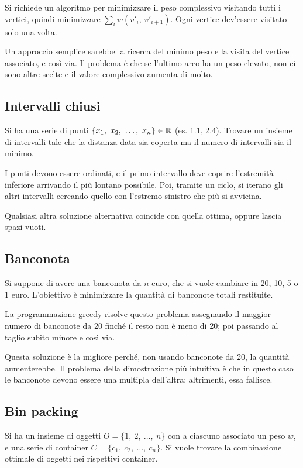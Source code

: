 Si richiede un algoritmo per minimizzare il peso complessivo visitando tutti i vertici, quindi minimizzare $\sum_{i} w(v'_i,\ v'_{i+1})$. Ogni vertice dev'essere visitato solo una volta.

Un approccio semplice sarebbe la ricerca del minimo peso e la visita del vertice associato, e così via. Il problema è che se l'ultimo arco ha un peso elevato, non ci sono altre scelte e il valore complessivo aumenta di molto. 

\subsection{Intervalli chiusi}
Si ha una serie di punti $\{x_1,\ x_2,\ \dots,\ x_n\} \in \R$ (es. 1.1, 2.4). Trovare un insieme di intervalli tale che la distanza data sia coperta ma il numero di intervalli sia il minimo.

I punti devono essere ordinati, e il primo intervallo deve coprire l'estremità inferiore arrivando il più lontano possibile. Poi, tramite un ciclo, si iterano gli altri intervalli cercando quello con l'estremo sinistro che più si avvicina. 

Qualsiasi altra soluzione alternativa coincide con quella ottima, oppure lascia spazi vuoti. 

\subsection{Banconota}
Si suppone di avere una banconota da $n$ euro, che si vuole cambiare in 20, 10, 5 o 1 euro. L'obiettivo è minimizzare la quantità di banconote totali restituite.

La programmazione greedy risolve questo problema assegnando il maggior numero di banconote da 20 finché il resto non è meno di 20; poi passando al taglio subito minore e così via.

Questa soluzione è la migliore perché, non usando banconote da 20, la quantità aumenterebbe. Il problema della dimostrazione più intuitiva è che in questo caso le banconote devono essere una multipla dell'altra: altrimenti, essa fallisce. 

\subsection{Bin packing}
Si ha un insieme di oggetti $O = \{1,\ 2,\ \dots,\ n\}$ con a ciascuno associato un peso $w$, e una serie di container $C = \{c_1,\ c_2,\ \dots,\ c_n\}$. Si vuole trovare la combinazione ottimale di oggetti nei rispettivi container.

